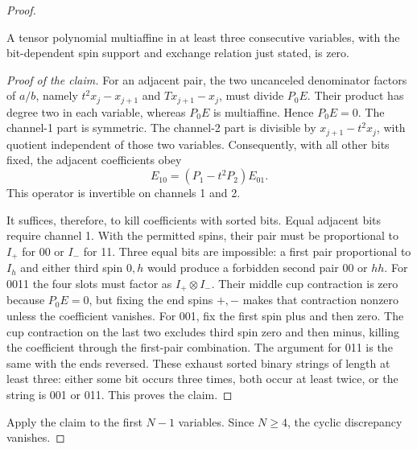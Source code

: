 \begin{proof}
\begin{claim}
A tensor polynomial multiaffine in at least three consecutive variables,
with the bit-dependent spin support and exchange relation just stated,
is zero.
\end{claim}

\begin{proof}[Proof of the claim]
For an adjacent pair, the two uncanceled denominator factors of
\(a/b\), namely \(t^2x_j-x_{j+1}\) and \(Tx_{j+1}-x_j\),
must divide \(P_0E\). Their product has degree two in each
variable, whereas \(P_0E\) is multiaffine. Hence \(P_0E=0\).
The channel-1 part is symmetric. The channel-2 part is divisible by
\(x_{j+1}-t^2x_j\), with quotient independent of those two variables.
Consequently, with all other bits fixed, the adjacent coefficients obey
\[
 E_{10}=(P_1-t^2P_2)E_{01}.
\]
This operator is invertible on channels 1 and 2.

It suffices, therefore, to kill coefficients with sorted bits. Equal
adjacent bits require channel 1. With the permitted spins, their pair
must be proportional to \(I_+\) for 00 or \(I_-\) for 11.
Three equal bits are impossible: a first pair proportional to \(I_h\)
and either third spin \(0,h\) would produce a forbidden second pair
\(00\) or \(hh\). For 0011 the four slots must factor as
\(I_+\otimes I_-\). Their middle cup contraction is zero because
\(P_0E=0\), but fixing the end spins \(+,-\) makes that contraction
nonzero unless the coefficient vanishes. For 001, fix the first spin
plus and then zero. The cup contraction on the last two excludes
third spin zero and then minus, killing the coefficient through the
first-pair combination. The argument for 011 is the same with the
ends reversed. These exhaust sorted binary strings of length at least
three: either some bit occurs three times, both occur at least twice,
or the string is 001 or 011. This proves the claim.
\end{proof}

Apply the claim to the first \(N-1\) variables. Since \(N\ge4\),
the cyclic discrepancy vanishes.


\end{proof}
